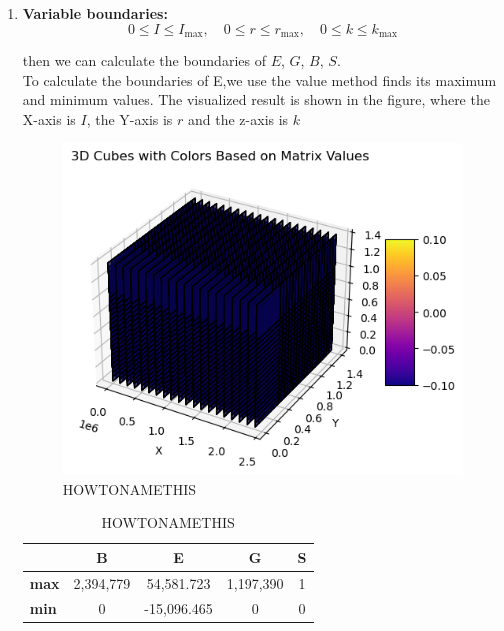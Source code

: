 \documentclass[UTF8]{mcmthesis}
\begin{document}
\begin{enumerate}
         \item \textbf{Variable boundaries:} \\
                \[
        0 \leq I \leq I_{\text{max}}, \quad 0 \leq r \leq r_{\text{max}}, \quad 0 \leq k \leq k_{\text{max}}
        \]

        then we can calculate the boundaries of $E$, $G$, $B$, $S$.\\
        To calculate the boundaries of E,we use the value method finds its maximum and minimum values. The visualized result is shown in the figure, where the X-axis is $I$, the Y-axis is $r$ and the z-axis is $k$
        
        \begin{figure}[htbp]
            \centering
            \includegraphics[width=12cm]{cube.png}
            \caption{HOWTONAMETHIS}
        \end{figure}
    
        \begin{table}[htbp]
            \centering
            \caption{HOWTONAMETHIS}
            \begin{tabular}{lcccc}
                \toprule
                & \textbf{B} & \textbf{E} & \textbf{G} & \textbf{S} \\
                \midrule
                \textbf{max} & 2,394,779 & 54,581.723 & 1,197,390 & 1 \\
                \textbf{min} & 0 & -15,096.465 & 0 & 0 \\
                \bottomrule
            \end{tabular}
            \label{tab:data_summary}
        \end{table}      
        \end{enumerate}
\end{document}
